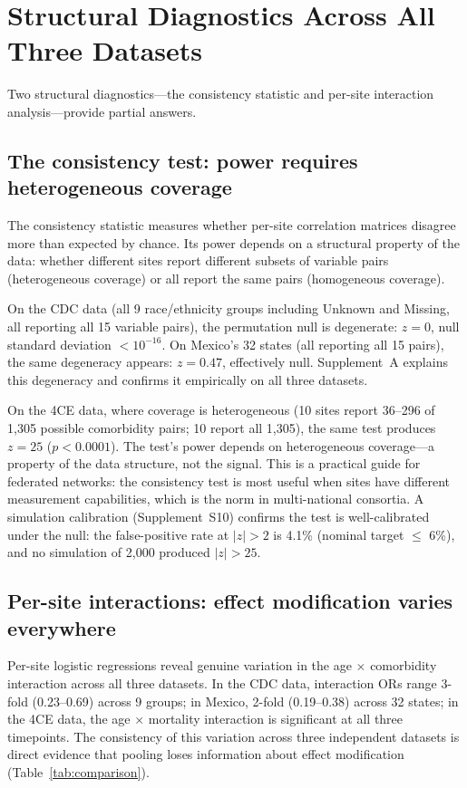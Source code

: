 \documentclass[11pt]{article}
\begin{document}
\section{Structural Diagnostics Across All Three Datasets}

Two structural diagnostics---the consistency statistic and per-site interaction
analysis---provide partial answers.

\subsection{The consistency test: power requires heterogeneous coverage}

The consistency statistic measures whether per-site correlation matrices
disagree more than expected by chance.  Its power depends on a structural
property of the data: whether different sites report different subsets of
variable pairs (heterogeneous coverage) or all report the same pairs
(homogeneous coverage).

On the CDC data (all 9 race/ethnicity groups including Unknown and
Missing, all reporting all 15 variable pairs), the
permutation null is degenerate: $z = 0$, null standard deviation
$< 10^{-16}$.  On Mexico's 32 states (all reporting all 15 pairs), the
same degeneracy appears: $z = 0.47$, effectively null.
Supplement~A explains this degeneracy and confirms it
empirically on all three datasets.

On the 4CE data, where coverage is heterogeneous (10 sites report
36--296 of 1,305 possible comorbidity pairs; 10 report all 1,305), the
same test produces $z = 25$ ($p < 0.0001$).  The test's power depends on
heterogeneous coverage---a property of the data structure, not the signal.
This is a practical guide for federated networks: the consistency test is
most useful when sites have different measurement capabilities,
which is the norm in multi-national consortia.  A simulation calibration
(Supplement~S10) confirms the test is well-calibrated under the null:
the false-positive rate at $|z| > 2$ is 4.1\% (nominal target
$\leq$ 6\%), and no simulation of 2{,}000 produced $|z| > 25$.


\subsection{Per-site interactions: effect modification varies everywhere}

Per-site logistic regressions reveal genuine variation in the
age $\times$ comorbidity interaction across all three datasets.  In the
CDC data, interaction ORs range 3-fold (0.23--0.69) across 9 groups; in
Mexico, 2-fold (0.19--0.38) across 32 states; in the 4CE data, the
age $\times$ mortality interaction is significant at all three timepoints.
The consistency of this variation across three independent datasets is
direct evidence that pooling loses information about effect modification
(Table~\ref{tab:comparison}).
\end{document}
